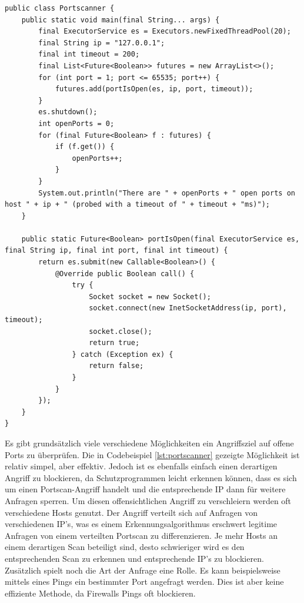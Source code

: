 \newpage
\begin{scriptsize}
\begin{lstlisting}
public class Portscanner {
    public static void main(final String... args) {
        final ExecutorService es = Executors.newFixedThreadPool(20);
        final String ip = "127.0.0.1";
        final int timeout = 200;
        final List<Future<Boolean>> futures = new ArrayList<>();
        for (int port = 1; port <= 65535; port++) {
            futures.add(portIsOpen(es, ip, port, timeout));
        }
        es.shutdown();
        int openPorts = 0;
        for (final Future<Boolean> f : futures) {
            if (f.get()) {
                openPorts++;
            }
        }
        System.out.println("There are " + openPorts + " open ports on host " + ip + " (probed with a timeout of " + timeout + "ms)");
    }
    
    public static Future<Boolean> portIsOpen(final ExecutorService es, final String ip, final int port, final int timeout) {
        return es.submit(new Callable<Boolean>() {
            @Override public Boolean call() {
                try {
                    Socket socket = new Socket();
                    socket.connect(new InetSocketAddress(ip, port), timeout);
                    socket.close();
                    return true;
                } catch (Exception ex) {
                    return false;
                }
            }
        });
    }
}
\end{lstlisting}
\end{scriptsize}

Es gibt grundsätzlich viele verschiedene Möglichkeiten ein Angriffsziel auf offene Ports zu
überprüfen. Die in Codebeispiel \ref{lst:portscanner} gezeigte Möglichkeit ist relativ simpel,
aber effektiv.
Jedoch ist es ebenfalls einfach einen derartigen Angriff zu blockieren, da Schutzprogrammen leicht
erkennen können, dass es sich um einen Portscan-Angriff handelt und die entsprechende IP dann für
weitere Anfragen sperren. Um diesen offensichtlichen Angriff zu verschleiern werden oft verschiedene
Hosts genutzt. Der Angriff verteilt sich auf Anfragen von verschiedenen IP's, was es einem
Erkennungsalgorithmus erschwert legitime Anfragen von einem verteilten Portscan zu differenzieren.
Je mehr Hosts an einem derartigen Scan beteiligt sind, desto schwieriger wird es den entsprechenden
Scan zu erkennen und entsprechende IP's zu blockieren. Zusätzlich spielt noch die Art der Anfrage
eine Rolle. Es kann beispielsweise mittels eines Pings ein bestimmter Port angefragt werden. Dies
ist aber keine effiziente Methode, da Firewalls Pings oft blockieren.


